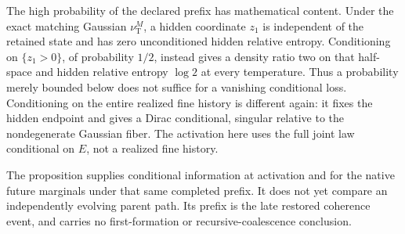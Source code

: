 The high probability of the declared prefix has mathematical content.
Under the exact matching Gaussian \(\nu_{\mathrm T}^M\), a hidden
coordinate \(z_1\) is independent of the retained state and has zero
unconditioned hidden relative entropy. Conditioning on
\(\{z_1>0\}\), of probability \(1/2\), instead gives a density ratio
two on that half-space and hidden relative entropy \(\log2\) at every
temperature. Thus a probability merely bounded below does not suffice
for a vanishing conditional loss. Conditioning on the entire realized
fine history is different again: it fixes the hidden endpoint and
gives a Dirac conditional, singular relative to the nondegenerate
Gaussian fiber. The activation here uses the full joint law conditional
on \(E\), not a realized fine history.

The proposition supplies conditional information at activation and for
the native future marginals under that same completed prefix. It does
not yet compare an independently evolving parent path. Its prefix is
the late restored coherence event, and carries no first-formation or
recursive-coalescence conclusion.


